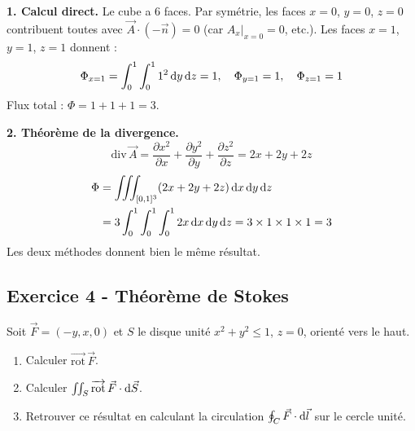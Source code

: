 \documentclass[12pt,a4paper]{article}
\begin{document}
\begin{boitecorrige}
\textbf{1. Calcul direct.} Le cube a 6 faces. Par symétrie, les faces $x=0$, $y=0$, $z=0$ contribuent toutes avec $\vec{A}\cdot(-\vec{n})=0$ (car $A_x|_{x=0}=0$, etc.). Les faces $x=1$, $y=1$, $z=1$ donnent :
\[
\Phi_{x=1} = \int_0^1\int_0^1 1^2\,\mathrm{d} y\,\mathrm{d} z = 1, \quad \Phi_{y=1} = 1, \quad \Phi_{z=1} = 1
\]
Flux total : $\Phi = 1+1+1 = 3$.

\textbf{2. Théorème de la divergence.}
\[
\text{div}\,\vec{A} = \frac{\partial x^2}{\partial x}+\frac{\partial y^2}{\partial y}+\frac{\partial z^2}{\partial z} = 2x+2y+2z
\]
\begin{align*}
\Phi &= \iiint_{[0,1]^3}(2x+2y+2z)\,\mathrm{d} x\,\mathrm{d} y\,\mathrm{d} z \\
&= 3\int_0^1\int_0^1\int_0^1 2x\,\mathrm{d} x\,\mathrm{d} y\,\mathrm{d} z = 3\times1\times1\times1 = 3
\end{align*}
Les deux méthodes donnent bien le même résultat.
\end{boitecorrige}

\subsection*{Exercice 4 - Théorème de Stokes \niveau{\moyen}}

\begin{boiteexercice}
Soit $\vec{F} = (-y, x, 0)$ et $S$ le disque unité $x^2+y^2\leq1$, $z=0$, orienté vers le haut.
\begin{enumerate}
  \item Calculer $\overrightarrow{\text{rot}}\,\vec{F}$.
  \item Calculer $\iint_S \overrightarrow{\text{rot}}\,\vec{F}\cdot\mathrm{d}\vec{S}$.
  \item Retrouver ce résultat en calculant la circulation $\oint_C \vec{F}\cdot\mathrm{d}\vec{l}$ sur le cercle unité.
\end{enumerate}
\end{boiteexercice}
\end{document}
